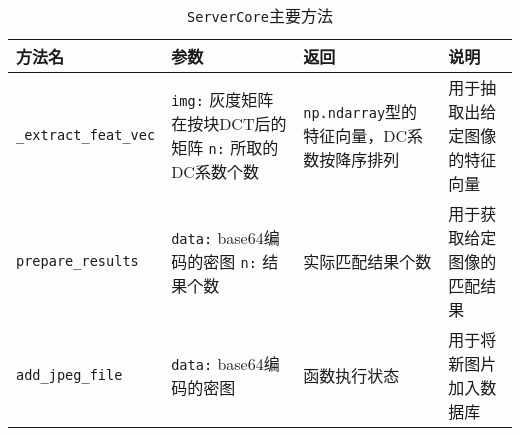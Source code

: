 \begin{table}[H]
  \centering
  \begin{tabular}[H]{| l | p{3.5cm} | p{3cm} | p{3cm} |}
    \hline
    \textbf{方法名} & \textbf{参数} & \textbf{返回} & \textbf{说明} \\
    \hline
    \texttt{\_extract\_feat\_vec}
  & \texttt{img:} 灰度矩阵在按块DCT后的矩阵\newline
    \texttt{n:} 所取的DC系数个数
  & \texttt{np.ndarray}型的特征向量，DC系数按降序排列
  & 用于抽取出给定图像的特征向量 \\
    \hline
    \texttt{prepare\_results}
  & \texttt{data:} base64编码的密图\newline
    \texttt{n:} 结果个数
  & 实际匹配结果个数
  & 用于获取给定图像的匹配结果 \\
    \hline
    \texttt{add\_jpeg\_file}
  & \texttt{data:} base64编码的密图
  & 函数执行状态 & 用于将新图片加入数据库 \\
    \hline
  \end{tabular}
  \caption{\texttt{ServerCore}主要方法}
  \label{tab:server-core}
\end{table}

